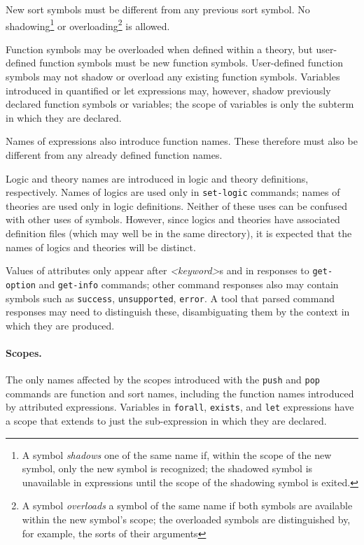 \documentclass[12pt,oneside]{report}
\newcommand{\keyword}{{\it <keyword>}}
\begin{document}
New sort symbols must be different from any previous sort symbol. No shadowing\footnote{A symbol {\it shadows} one of the same name if, within the scope of the new symbol, only the new symbol is recognized; the shadowed symbol is unavailable in expressions until the scope of the shadowing symbol is exited.} or overloading\footnote{A symbol {\it overloads} a symbol of the same name if both symbols are available within
the new symbol's scope; the overloaded symbols are distinguished by, for example, the sorts of their arguments} is allowed.

Function symbols may be overloaded when defined within a theory, but user-defined function symbols must be
new function symbols. User-defined function symbols may not shadow or overload any existing function
symbols. Variables introduced in quantified or let expressions may, however, shadow previously declared
function symbols or variables; the scope of variables is only the subterm in which they are declared.

Names of expressions also introduce function names.  These therefore must also be different from any 
already defined function names.

Logic and theory names are introduced in logic and theory definitions, respectively. Names of logics
are used only in {\tt set-logic} commands; names of theories are used only in logic definitions. Neither
of these uses can be confused with other uses of symbols. However, since logics and theories have associated
definition files (which may well be in the same directory), it is expected that the names of logics and
theories will be distinct.

Values of attributes only appear after \keyword s and in responses to {\tt get-option} and {\tt get-info}
commands; other command responses also may contain symbols such as {\tt success}, {\tt unsupported},
{\tt error}. A tool that parsed command responses may need to distinguish these, disambiguating them
by the context in which they are produced.

\paragraph{Scopes.}
The only names affected by the scopes introduced with the {\tt push} and {\tt pop} commands are function 
and sort names, including the function names introduced by attributed expressions. Variables in {\tt forall},
{\tt exists}, and {\tt let} expressions have a scope that extends to just the sub-expression in which they are 
declared.
\end{document}
